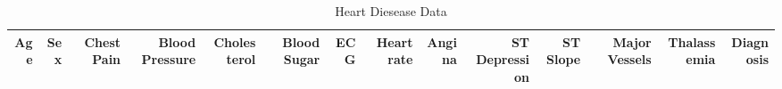 \documentclass[times]{article}
\begin{document}
   \begin{landscape}
      \scriptsize
      \begin{longtable}{|rrrrrrrrrrrrrr|}
         \caption{Heart Diesease Data}
         \label{tab:raw_data}
         \hline
         Age & Sex & Chest Pain & Blood Pressure & Cholesterol & Blood Sugar & 
            ECG & Heart rate & Angina & ST Depression & ST Slope & Major Vessels 
            & Thalassemia & Diagnosis \\
         \endhead
         \hline
         
      \end{longtable}
   \end{landscape}
\end{document}
